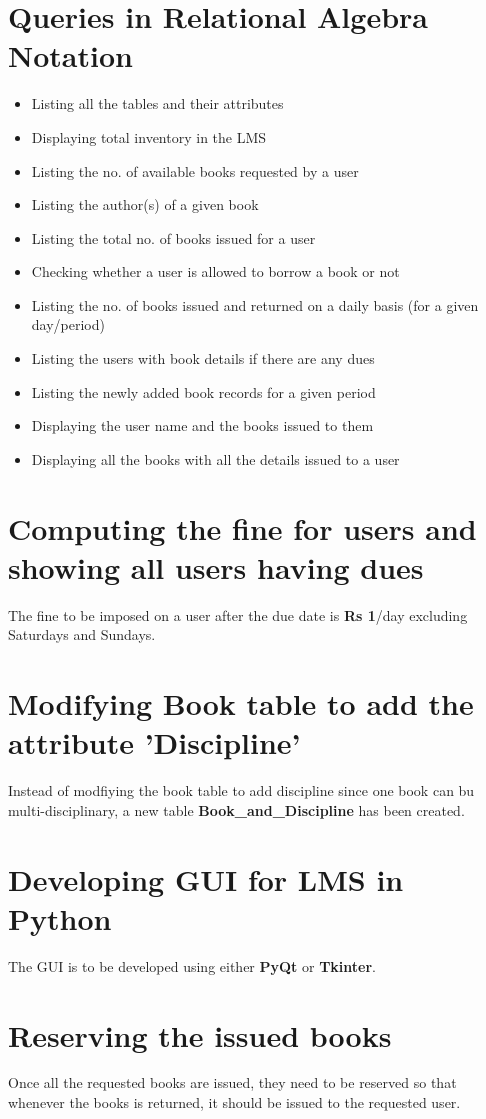 \documentclass{article}
\begin{document}
\section{Queries in Relational Algebra Notation}
\begin{itemize}
    \item Listing all the tables and their attributes
    \item Displaying total inventory in the LMS
    \item Listing the no. of available books requested by a user
    \item Listing the author(s) of a given book
    \item Listing the total no. of books issued for a user
    \item Checking whether a user is allowed to borrow a book or not
    \item Listing the no. of books issued and returned on a daily basis (for a given day/period)
    \item Listing the users with book details if there are any dues
    \item Listing the newly added book records for a given period
    \item Displaying the user name and the books issued to them
    \item Displaying all the books with all the details issued to a user
\end{itemize}

\section{Computing the fine for users and showing all users having dues}
The fine to be imposed on a user after the due date is \textbf{Rs 1}/day excluding Saturdays and Sundays. 

\section{Modifying Book table to add the attribute 'Discipline'}
Instead of modfiying the book table to add discipline since one book can bu multi-disciplinary, a new table \textbf{\color{green}Book\_and\_Discipline} has been created. 

\section{Developing GUI for LMS in Python}
The GUI is to be developed using either \textbf{PyQt} or \textbf{Tkinter}.

\section{Reserving the issued books}
Once all the requested books are issued, they need to be reserved so that whenever the books is returned, it should be issued to the requested user. 
\end{document}
